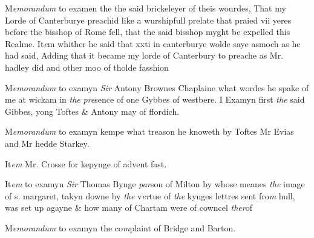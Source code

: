 \documentclass[12pt, a4paper]{book}
\begin{document}
	
		\ifthenelse{\isodd{\thepage}}
		{\reversemarginpar}
		{\normalmarginpar}
		M\textit{emorandum} to examen the the said brickeleyer of theis wourdes, That my
		Lorde of Canterburye preachid like a wurshipfull prelate
 that praied vii yeres before the bisshop of Rome fell, that
 the said bisshop myght be expelled this Realme.
		It\textit{e}m whither he said that xxti in canterburye wolde saye asmoch
		as he had said, Adding that it became my lorde of Canterbury
		to preache as Mr. hadley did and other moo of tholde fasshion
 

            

		\ifthenelse{\isodd{\thepage}}
		{\reversemarginpar}
		{\normalmarginpar}
		M\textit{emorandum} to examyn \textit{Sir} Antony Brownes Chaplaine what
 wordes he spake of me at wickam in \textit{the}
               \textit{pre}sence of one
	Gybbes of westbere. I Examyn first \textit{the} said Gibbes, yong
 Toftes \& Antony may of ffordich.

            
            	
				\marginpar[\vspace{0.5cm}{\textcolor{Gray}{n}}]{}
			
		\ifthenelse{\isodd{\thepage}}
		{\reversemarginpar}
		{\normalmarginpar}
		M\textit{emorandum} to examyn kempe what treason he knoweth by Toftes
            		Mr Evias and Mr hedde Starkey.
            	
		\ifthenelse{\isodd{\thepage}}
		{\reversemarginpar}
		{\normalmarginpar}
		It\textit{em} Mr. Crosse for kepynge of advent fast.
            		
		\ifthenelse{\isodd{\thepage}}
		{\reversemarginpar}
		{\normalmarginpar}
		It\textit{em} to examyn \textit{Sir} Thomas Bynge \textit{par}son of Milton by
 whose meanes \textit{the} image of s. margaret, takyn downe
 by \textit{the} v\textit{er}tue of \textit{the} kynges lettres sent fro\textit{m} hull, was set
 up agayne \& how many of Chartam were of cowncel \textit{ther}of
 

            
            	
		\ifthenelse{\isodd{\thepage}}
		{\reversemarginpar}
		{\normalmarginpar}
		M\textit{emorandum} to examyn the co\textit{m}plaint of Bridge and Barton.
\end{document}
